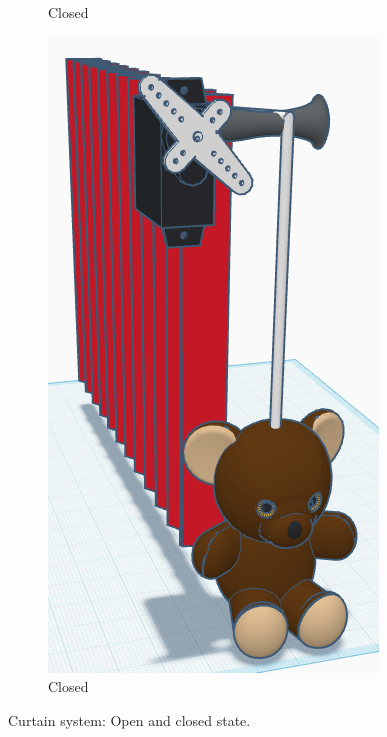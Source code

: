 \documentclass[a4paper,12pt]{article}
\begin{document}
\begin{figure}
\begin{subfigure}[][][]{0.5\textwidth}
        \caption{Closed}
    \end{subfigure}
    \begin{subfigure}[][][b]{0.4\textwidth}
        \includegraphics[width=\linewidth]{figures/curtainModelClosedFront.png}
        \caption{Closed}
    \end{subfigure}
 
    \caption{Curtain system: Open and closed state.}
    \label{fig:CurtainMechanismOpen}
\end{figure}
\end{document}
